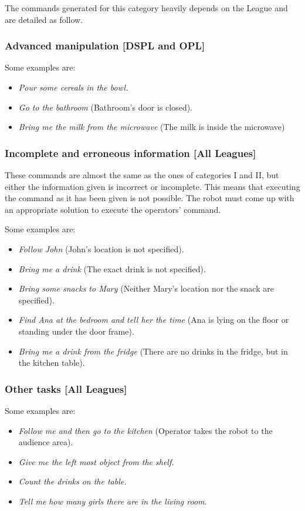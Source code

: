 The commands generated for this category heavily depends on the League and are detailed as follow.

\subsubsection{Advanced manipulation [DSPL and OPL]}
Some examples are:
\begin{itemize}
	\item \textit{Pour some cereals in the bowl.}
	\item \textit{Go to the bathroom} (Bathroom's door is closed).
	\item \textit{Bring me the milk from the microwave} (The milk is inside the microwave)
\end{itemize}

\subsubsection{Incomplete and erroneous information [All Leagues]}
These commands are almost the same as the ones of categories I and II, but either the information given is incorrect or incomplete. This means that executing the command as it has been given is not possible. The robot must come up with an appropriate solution to execute the operators' command.

Some examples are:
\begin{itemize}
	\item \textit{Follow John} (John's location is not specified).
	\item \textit{Bring me a drink} (The exact drink is not specified).
	\item \textit{Bring some snacks to Mary} (Neither Mary's location nor the snack are specified).
	\item \textit{Find Ana at the bedroom and tell her the time} (Ana is lying on the floor or standing under the door frame).
	\item \textit{Bring me a drink from the fridge} (There are no drinks in the fridge, but in the kitchen table).
\end{itemize}

\subsubsection{Other tasks [All Leagues]}
Some examples are:
\begin{itemize}
	\item \textit{Follow me and then go to the kitchen} (Operator takes the robot to the audience area).
	\item \textit{Give me the left most object from the shelf.}
	\item \textit{Count the drinks on the table.}
	\item \textit{Tell me how many girls there are in the living room.}
\end{itemize}


